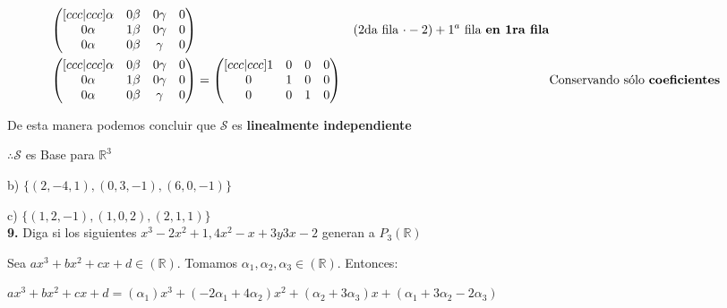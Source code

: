\documentclass[letterpaper]{article}
\newcommand{\R}{\mathds{R}}
\renewcommand{\*}{\cdot}
\theoremstyle{definition}
\begin{document}
\begin{align*}
\begin{pmatrix}[ccc|ccc]
		\alpha & 0\beta & 0\gamma & 0\\
		0\alpha & 1\beta & 0\gamma& 0\\
		0\alpha & 0\beta & \gamma & 0
		\end{pmatrix} && \text{(2da fila $ \* -2) + 1^{a} $ fila \textbf{en 1ra fila}}\\
		\begin{pmatrix}[ccc|ccc]
		\alpha & 0\beta & 0\gamma & 0\\
		0\alpha & 1\beta & 0\gamma& 0\\
		0\alpha & 0\beta & \gamma &0
		\end{pmatrix} & = \begin{pmatrix}[ccc|ccc]
		1 & 0 & 0 &0\\
		0 & 1 & 0& 0\\
		0 & 0 & 1 & 0
		\end{pmatrix} && \text{Conservando sólo \textbf{coeficientes}}
		\end{align*}
		
		De esta manera podemos concluir que $ \mathcal{S} $ es \textbf{linealmente independiente} 
		\begin{center}
			$ \therefore \mathcal{S} $ es Base para $ \R^3 $ 
		\end{center}
	b) $\lbrace (2,-4,1),(0,3,-1),(6,0,-1) \rbrace$
	
	
	c) $\lbrace (1,2,-1),(1,0,2),(2,1,1) \rbrace$\\
\noindent \textbf{9.} Diga si los siguientes $x^3-2x^2+1,4x^2-x+3 y 3x-2$ generan a $P_{3}(\R)$

Sea $ax^3+bx^2+cx+d\in(\R)$. Tomamos $\alpha_{1},\alpha_{2},\alpha_{3}\in (\R)$. Entonces:

$ax^3+bx^2+cx+d = (\alpha_{1})x^3 + (-2\alpha_{1}+4\alpha_{2})x^2 + (\alpha_{2}+3\alpha_{3})x + (\alpha_{1}+3\alpha_{2}-2\alpha_{3})$
\end{document}
